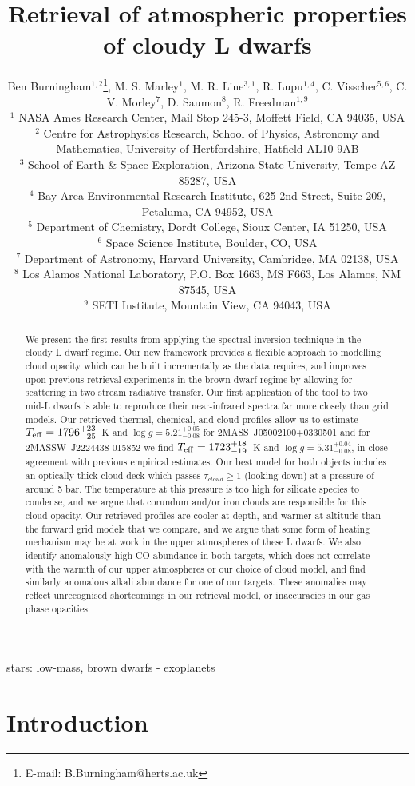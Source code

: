 \documentclass[useAMS,usenatbib]{mn2e}
\title[Retrievals of L dwarfs]{Retrieval of atmospheric properties of cloudy L dwarfs}
\author[Burningham et al]{Ben Burningham$^{1,2}$\thanks{E-mail:
    B.Burningham@herts.ac.uk}, M. S. Marley$^{1}$, M. R. Line$^{3,1}$, R. Lupu$^{1,4}$, C. Visscher$^{5,6}$, 
    \newauthor  C. V. Morley$^{7}$, D. Saumon$^{8}$,  R. Freedman$^{1,9}$\\
$^{1}$ NASA Ames Research Center, Mail Stop 245-3, Moffett Field, CA 94035, USA \\
$^{2}$ Centre for Astrophysics Research, School of Physics, Astronomy and Mathematics, University of Hertfordshire, Hatfield AL10 9AB \\
$^{3}$ School of Earth \& Space Exploration, Arizona State University, Tempe AZ 85287, USA \\
$^{4}$ Bay Area Environmental Research Institute, 625 2nd Street, Suite 209, Petaluma, CA 94952, USA\\
$^{5}$ Department of Chemistry, Dordt College, Sioux Center, IA 51250, USA \\
$^{6}$ Space Science Institute, Boulder, CO, USA \\
$^{7}$ Department of Astronomy, Harvard University, Cambridge, MA 02138, USA \\
$^{8}$ Los Alamos National Laboratory, P.O. Box 1663, MS F663, Los Alamos, NM 87545, USA \\
$^{9}$ SETI Institute, Mountain View, CA 94043, USA
}
\begin{document}




\maketitle


\begin{abstract}
We present the first results from applying the spectral inversion technique in the cloudy L dwarf regime. Our new framework provides a flexible approach to modelling cloud opacity which can be built incrementally as the data requires, and improves upon previous retrieval experiments in the brown dwarf regime by allowing for scattering in two stream radiative transfer.  Our first application of the tool to two mid-L dwarfs is able to reproduce their near-infrared spectra far more closely than grid models. Our retrieved thermal, chemical, and cloud profiles allow us to estimate $T_{\rm eff} = 1796^{+23}_{-25}$~K and $\log g  = 5.21^{+0.05}_{-0.08}$ for 2MASS~J05002100+0330501 and for 2MASSW~J2224438-015852 we find $T_{\rm eff} = 1723^{+18}_{-19}$~K and $\log g = 5.31^{+0.04}_{-0.08}$, in close agreement with previous empirical estimates.
Our best model for both objects includes an optically thick cloud deck which passes $\tau_{cloud} \geq 1$ (looking down) at a pressure of around 5 bar. The temperature at this pressure is too high for silicate species to condense, and we argue that corundum and/or iron clouds are responsible for this cloud opacity. Our retrieved profiles are cooler at depth, and warmer at altitude than the forward grid models that we compare, and we argue that some form of heating mechanism may be at work in the upper atmospheres of these L dwarfs. We also identify anomalously high CO abundance in both targets, which does not correlate with the warmth of our upper atmospheres or our choice of cloud model, and find similarly anomalous alkali abundance for one of our targets. These anomalies may reflect unrecognised shortcomings in our retrieval model, or inaccuracies in our gas phase opacities.
 \end{abstract}


\begin{keywords}
stars: low-mass, brown dwarfs - exoplanets
\end{keywords}




\section{Introduction}
\label{sec:intro}
 
\end{document}
